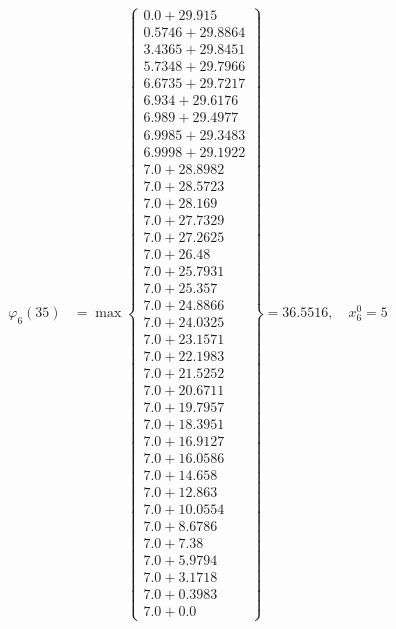 \documentclass{article}
\begin{document}
\begin{align*}
\varphi_{6}(35) &= \max \left\{ \begin{array}{c}
0.0 + 29.915 \\
 0.5746 + 29.8864 \\
 3.4365 + 29.8451 \\
 5.7348 + 29.7966 \\
 6.6735 + 29.7217 \\
 6.934 + 29.6176 \\
 6.989 + 29.4977 \\
 6.9985 + 29.3483 \\
 6.9998 + 29.1922 \\
 7.0 + 28.8982 \\
 7.0 + 28.5723 \\
 7.0 + 28.169 \\
 7.0 + 27.7329 \\
 7.0 + 27.2625 \\
 7.0 + 26.48 \\
 7.0 + 25.7931 \\
 7.0 + 25.357 \\
 7.0 + 24.8866 \\
 7.0 + 24.0325 \\
 7.0 + 23.1571 \\
 7.0 + 22.1983 \\
 7.0 + 21.5252 \\
 7.0 + 20.6711 \\
 7.0 + 19.7957 \\
 7.0 + 18.3951 \\
 7.0 + 16.9127 \\
 7.0 + 16.0586 \\
 7.0 + 14.658 \\
 7.0 + 12.863 \\
 7.0 + 10.0554 \\
 7.0 + 8.6786 \\
 7.0 + 7.38 \\
 7.0 + 5.9794 \\
 7.0 + 3.1718 \\
 7.0 + 0.3983 \\
 7.0 + 0.0
\end{array} \right\}=36.5516, \quad x_{6}^0=5\\
  

\end{align*}
\end{document}
